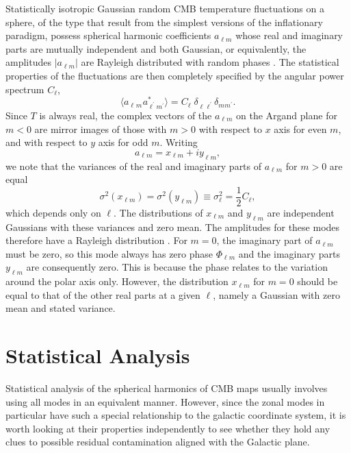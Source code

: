 \documentclass[useAMS,usenatbib,usegraphicx]{mn2e}
\def\l{{\ell}}
\def\lm{{\l m}}
\def\alm{a_{\lm}}
\def\cl{C_{\l}}
\begin{document}
Statistically isotropic Gaussian random CMB temperature fluctuations
on a sphere, of the type that result from the simplest versions of
the inflationary paradigm, possess spherical harmonic coefficients
$\alm$ whose real and imaginary parts are mutually independent and
both Gaussian, or equivalently, the amplitudes $|\alm|$ are Rayleigh
distributed with random phases \citep{be,coles}. The statistical
properties of the fluctuations are then completely specified by the
angular power spectrum $\cl$,
\begin{equation}
\langle  a^{}_{\l^{ } m^{ }} a^{*}_{\l^{'} m^{'}} \rangle = \cl \;
\delta_{\l^{ } \l^{'}} \delta_{m^{} m^{'}}.
\end{equation}
Since $T$ is always real, the complex vectors of the $\alm$ on the
Argand plane for $m<0$ are mirror images of those with $m>0$ with
respect to $x$ axis for even $m$, and with respect to $y$ axis for
odd $m$. Writing \begin{equation} \alm = x_\lm + i y_\lm,
\end{equation}
we note that the variances of the real and imaginary parts of $\alm$
for $m>0$ are equal
\begin{equation}
\sigma^2(x_{\lm})=\sigma^2(y_{\lm})\equiv
\sigma^2_{\l}=\frac{1}{2}\cl,
\end{equation}
which depends only on $\l$. The distributions of $x_{\lm}$ and
$y_{\lm}$ are independent Gaussians with these variances and zero
mean. The amplitudes for these modes therefore have a Rayleigh
distribution \citep{be,sc}. For $m=0$, the imaginary part of $\alm$
must be zero, so this mode always has zero phase $\Phi_{\lm}$ and
the imaginary parts $y_{\lm}$ are consequently zero. This is because
the phase relates to the variation around the polar axis only.
However, the distribution $x_{\lm}$ for $m=0$ should be equal to
that of the other real parts at a given $\l$, namely a Gaussian with
zero mean and stated variance.



\section{Statistical Analysis}

Statistical analysis of the spherical harmonics of CMB maps usually
involves using all modes in an equivalent manner. However, since the
zonal modes in particular have such a special relationship to the
galactic coordinate system, it is worth looking at their properties
independently to see whether they hold any clues to possible
residual contamination aligned with the Galactic plane.
\end{document}
